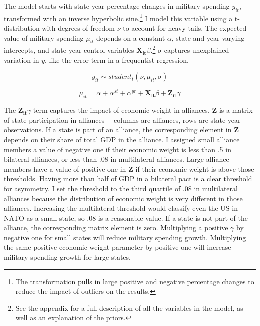 \documentclass[12pt]{article}
\begin{document}
The model starts with state-year percentage changes in military spending $y_{it}$, transformed with an inverse hyperbolic sine.\footnote{The transformation pulls in large positive and negative percentage changes to reduce the impact of outliers on the results.} 
I model this variable using a t-distribution with degrees of freedom $\nu$ to account for heavy tails.
The expected value of military spending $\mu_{it}$ depends on a constant $\alpha$, state and year varying intercepts, and state-year control variables $\mathbf{X_{it}} \beta$.\footnote{See the appendix for a full description of all the variables in the model, as well as an explanation of the priors.} 
$\sigma$ captures unexplained variation in $y$, like the error term in a frequentist regression. 

\begin{equation}
y_{it} \sim student_t(\nu, \mu_{it}, \sigma) 
\end{equation}

\begin{equation}
\mu_{it} = \alpha + \alpha^{st} + \alpha^{yr} + \mathbf{X_{it}} \beta + \mathbf{Z_{it}} \gamma
\end{equation}


The $\mathbf{Z_{it}} \gamma$ term captures the impact of economic weight in alliances.  
$\textbf{Z}$ is a matrix of state participation in alliances--- columns are alliances, rows are state-year observations.  
If a state is part of an alliance, the corresponding element in $\textbf{Z}$ depends on their share of total GDP in the alliance. 
I assigned small alliance members a value of negative one if their economic weight is less than .5 in bilateral alliances, or less than .08 in multilateral alliances.
Large alliance members have a value of positive one in $\textbf{Z}$ if their economic weight is above those thresholds. 
Having more than half of GDP in a bilateral pact is a clear threshold for asymmetry. 
I set the threshold to the third quartile of .08 in multilateral alliances because the distribution of economic weight is very different in those alliances. 
Increasing the multilateral threshold would classify even the US in NATO as a small state, so .08 is a reasonable value. 
If a state is not part of the alliance, the corresponding matrix element is zero. 
Multiplying a positive $\gamma$ by negative one for small states will reduce military spending growth.
Multiplying the same positive economic weight parameter by positive one will increase military spending growth for large states. 
\end{document}
